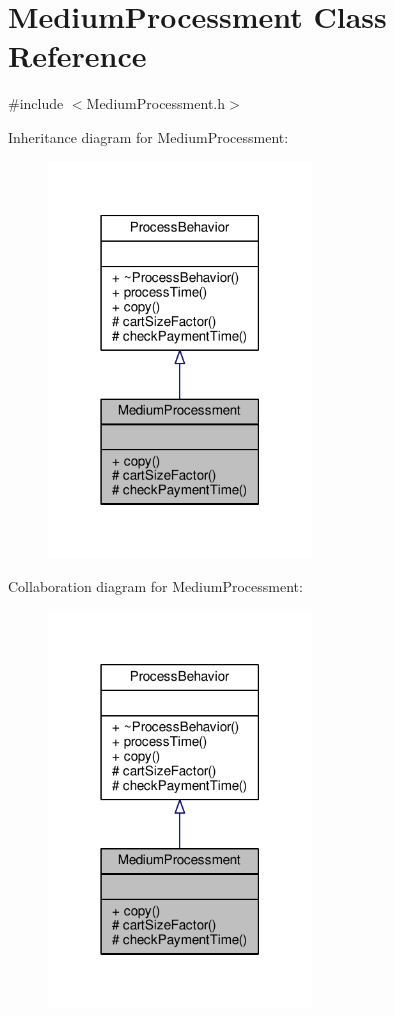 \hypertarget{classMediumProcessment}{\section{Medium\-Processment Class Reference}
\label{classMediumProcessment}
}


{\ttfamily \#include $<$Medium\-Processment.\-h$>$}



Inheritance diagram for Medium\-Processment\-:\nopagebreak
\begin{figure}[H]
\begin{center}
\leavevmode
\includegraphics[width=198pt]{classMediumProcessment__inherit__graph}
\end{center}
\end{figure}


Collaboration diagram for Medium\-Processment\-:\nopagebreak
\begin{figure}[H]
\begin{center}
\leavevmode
\includegraphics[width=198pt]{classMediumProcessment__coll__graph}
\end{center}
\end{figure}
